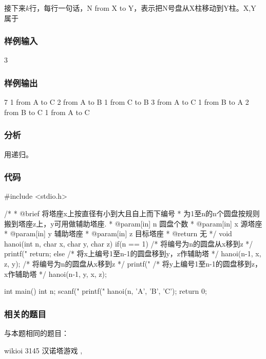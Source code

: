 接下来$k$行，每行一句话，N from X to Y，表示把N号盘从X柱移动到Y柱。X,Y 属于


\subsubsection{样例输入}
\begin{Code}
3
\end{Code}


\subsubsection{样例输出}
\begin{Code}
7
1 from A to C
2 from A to B
1 from C to B
3 from A to C
1 from B to A
2 from B to C
1 from A to C
\end{Code}

\subsubsection{分析}
用递归。


\subsubsection{代码}

\begin{Codex}[label=hanoi.c]
#include <stdio.h>

/*
 * @brief 将塔座x上按直径有小到大且自上而下编号
 * 为1至n的n个圆盘按规则搬到塔座z上，y可用做辅助塔座.
 * @param[in] n 圆盘个数
 * @param[in] x 源塔座
 * @param[in] y 辅助塔座
 * @param[in] z 目标塔座
 * @return 无
 */
void hanoi(int n, char x, char y, char z) {
    if(n ==  1) {
        /* 将编号为n的圆盘从x移到z */
        printf("%
        return;
    } else {
        /* 将x上编号1至n-1的圆盘移到y，z作辅助塔 */
        hanoi(n-1, x, z, y);
        /* 将编号为n的圆盘从x移到z */
        printf("%
        /* 将y上编号1至n-1的圆盘移到z，x作辅助塔 */
        hanoi(n-1, y, x, z);
    }
}

int main() {
    int n;
    scanf("%
    printf("%
    hanoi(n, 'A', 'B', 'C');
    return 0;
}
\end{Codex}


\subsubsection{相关的题目}
与本题相同的题目：
\begindot
\item wikioi 3145 汉诺塔游戏 , 
\myenddot

